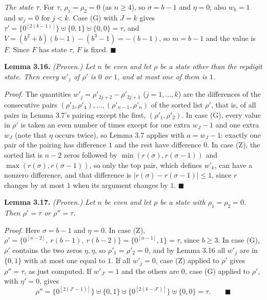 \documentclass[11pt,letterpaper]{article}
\theoremstyle{paperstyle}
\theoremstyle{paperstyledef}
\theoremstyle{paperstylerem}
\begin{document}
\emph{The state \(\tau\).} For \(\tau\), \(\rho_1 = \rho_2 = 0\) (as \(n \geq 4\)), so \(\sigma = b - 1\) and \(\eta = 0\); also \(w_k = 1\) and \(w_j = 0\) for \(j < k\). Case (G) with \(J = k\) gives \(\tau' = \{0^{[2(k-1)]}\} \uplus \{0, 1\} \uplus \{0, 0\} = \tau\), and \(V = (b^2 + b)(b-1) - (b^3 - 1) = -(b-1)\), so \(m = b - 1\) and the value is \(F\). Since \(F\) has state \(\tau\), \(F\) is fixed. \(\blacksquare\)

\textbf{Lemma 3.16.} \emph{(Proven.) Let \(n\) be even and let \(\rho\) be a state other than the repdigit state. Then every \(w'_j\) of \(\rho'\) is \(0\) or \(1\), and at most one of them is \(1\).}

\emph{Proof.} The quantities \(w'_j = \rho'_{2j+2} - \rho'_{2j+1}\) (\(j = 1, \dots, k\)) are the differences of the consecutive pairs \((\rho'_3, \rho'_4), \dots, (\rho'_{n-1}, \rho'_n)\) of the sorted list \(\rho'\), that is, of all pairs in Lemma 3.7's pairing except the first, \((\rho'_1, \rho'_2)\). In case (G), every value in \(\rho'\) is taken an even number of times except for one extra \(w_J - 1\) and one extra \(w_J\) (note that \(\eta\) occurs twice), so Lemma 3.7 applies with \(a = w_J - 1\): exactly one pair of the pairing has difference \(1\) and the rest have difference \(0\). In case (Z), the sorted list is \(n - 2\) zeros followed by \(\min(r(\sigma), r(\sigma-1))\) and \(\max(r(\sigma), r(\sigma-1))\), so only the top pair, which defines \(w'_k\), can have a nonzero difference, and that difference is \(\lvert r(\sigma) - r(\sigma - 1) \rvert \leq 1\), since \(r\) changes by at most \(1\) when its argument changes by \(1\). \(\blacksquare\)

\textbf{Lemma 3.17.} \emph{(Proven.) Let \(n\) be even and let \(\rho\) be a state with \(\rho_1 = \rho_2 = 0\). Then \(\rho' = \tau\) or \(\rho'' = \tau\).}

\emph{Proof.} Here \(\sigma = b - 1\) and \(\eta = 0\). In case (Z), \(\rho' = \{0^{[n-2]},\ r(b-1),\ r(b-2)\} = \{0^{[n-1]}, 1\} = \tau\), since \(b \geq 3\). In case (G), \(\rho'\) contains the two zeros \(\eta, \eta\), so \(\rho'_1 = \rho'_2 = 0\), and by Lemma 3.16 all \(w'_j\) are in \(\{0, 1\}\) with at most one equal to \(1\). If all \(w'_j = 0\), case (Z) applied to \(\rho'\) gives \(\rho'' = \tau\), as just computed. If \(w'_{J'} = 1\) and the others are \(0\), case (G) applied to \(\rho'\), with \(\eta' = 0\), gives \[\rho'' = \{0^{[2(J'-1)]}\} \uplus \{0, 1\} \uplus \{0^{[2(k-J')]}\} \uplus \{0, 0\} = \tau. \qquad \blacksquare\]
\end{document}
